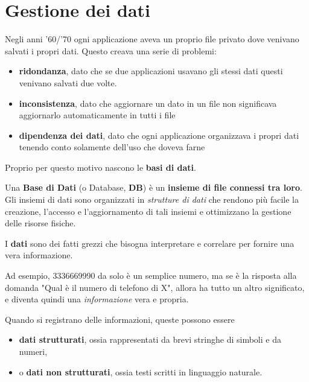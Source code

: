 \documentclass[11pt, a4paper, titlepage, oneside]{scrbook}
\begin{document}
\section{Gestione dei dati}

Negli anni '60/'70 ogni applicazione aveva un proprio file privato dove venivano salvati i propri dati. Questo creava una serie di problemi:
\begin{itemize}
    \item \textbf{ridondanza}, dato che se due applicazioni usavano gli stessi dati questi venivano salvati due volte.
    \item \textbf{inconsistenza}, dato che aggiornare un dato in un file non significava aggiornarlo automaticamente in tutti i file
    \item \textbf{dipendenza dei dati}, dato che ogni applicazione organizzava i propri dati tenendo conto solamente dell'uso che doveva farne
\end{itemize}

Proprio per questo motivo nascono le \textbf{basi di dati}.

\begin{Definizione}
\label{def-basi-di-dati}
Una \textbf{Base di Dati} (o Database, \textbf{DB}) è un \textbf{insieme di file connessi tra loro}. Gli insiemi di dati sono organizzati in \textit{strutture di dati} che rendono più facile la creazione, l'accesso e l'aggiornamento di tali insiemi e ottimizzano la gestione delle risorse fisiche.
\end{Definizione}

\begin{Definizione}[Dati]
\label{def-dati}
I \textbf{dati} sono dei fatti grezzi che bisogna interpretare e correlare per fornire una vera informazione.
\end{Definizione}

Ad esempio, 3336669990 da solo è un semplice numero, ma se è la risposta alla domanda "Qual è il numero di telefono di X", allora ha tutto un altro significato, e diventa quindi una \textit{informazione} vera e propria.

Quando si registrano delle informazioni, queste possono essere
\begin{itemize}
    \item \textbf{dati strutturati}, ossia rappresentati da brevi stringhe di simboli e da numeri,
    \item o \textbf{dati non strutturati}, ossia testi scritti in linguaggio naturale.
\end{itemize}
\end{document}
